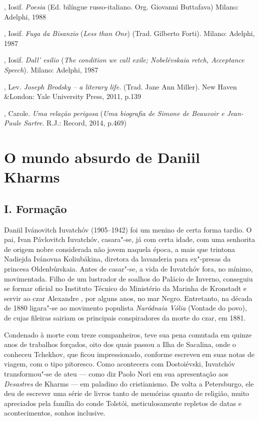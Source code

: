 , Iosif. \emph{Poesia} (Ed. bilíngue russo-italiano. Org.
Giovanni Buttafava) Milano: Adelphi, 1988

, Iosif. \emph{Fuga da Bisanzio} (\emph{Less than One}) (Trad.
Gilberto Forti). Milano: Adelphi, 1987

, Iosif. \emph{Dall' esilio} (\emph{The condition we call exile;
Nobelévskaia retch, Acceptance Speech}). Milano: Adelphi, 1987

, Lev. \emph{Joseph Brodsky -- a literary life.} (Trad. Jane Ann
Miller). New Haven \&London: Yale University Press, 2011, p.139

, Carole. \emph{Uma relação perigosa} (\emph{Uma biografia
de Simone de Beauvoir e Jean-Paule Sartre}. R.J.: Record, 2014, p.469)

\chapter{O mundo absurdo de Daniil Kharms}

\section{I. Formação}

Daniil Ivánovitch Iuvatchóv (1905--1942) foi um menino de certa forma
tardio. O pai, Ivan Pávlovitch Iuvatchóv, casara"-se, já com certa idade,
com uma senhorita de origem nobre considerada não jovem naquela época, a
mais que trintona Nadiejda Ivánovna Koliubákina, diretora da lavanderia
para ex"-presas da princesa Oldenbúrskaia. Antes de casar"-se, a vida de
Iuvatchóv fora, no mínimo, movimentada. Filho de um lustrador de soalhos
do Palácio de Inverno, conseguiu se formar oficial no Instituto Técnico
do Ministério da Marinha de Kronstadt e servir ao czar Alexandre ,
por alguns anos, no mar Negro. Entretanto, na década de 1880 ligara"-se
ao movimento populista \emph{Naródnaia Vólia} (Vontade do povo), de
cujas fileiras sairiam os principais conspiradores da morte do czar, em
1881.

Condenado à morte com treze companheiros, teve sua pena comutada em
quinze anos de trabalhos forçados, oito dos quais passou a Ilha de
Sacalina, onde o conheceu Tchekhov, que ficou impressionado, conforme
escreveu em suas notas de viagem, com o tipo pitoresco. Como acontecera
com Dostoiévski, Iuvatchóv transformou"-se de ateu --- como diz Paolo Nori
em sua apresentação aos \emph{Desastres} de Kharms --- em paladino do
cristianismo. De volta a Petersburgo, ele deu de escrever uma série de
livros tanto de memórias quanto de religião, muito apreciados pela
família do conde Tolstói, meticulosamente repletos de datas e
acontecimentos, sonhos inclusive.

